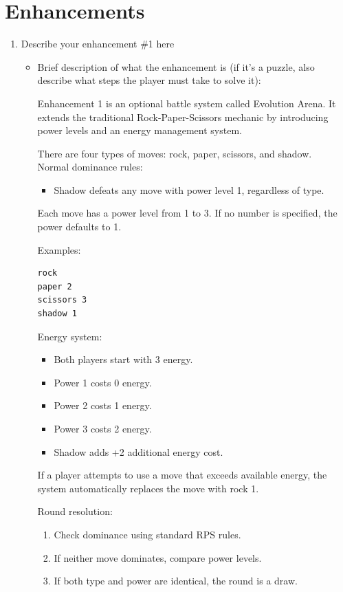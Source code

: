 \documentclass[11pt]{article}
\begin{document}
\section*{Enhancements}
\begin{enumerate}
    \item Describe your enhancement \#1 here
    \begin{itemize}
        \item Brief description of what the enhancement is (if it's a puzzle, also describe what steps the player must take to solve it):

        Enhancement 1 is an optional battle system called Evolution Arena. It extends the traditional Rock-Paper-Scissors mechanic by introducing power levels and an energy management system.

        There are four types of moves: rock, paper, scissors, and shadow.\\

        Normal dominance rules:
        \begin{itemize}
            \item Shadow defeats any move with power level 1, regardless of type.
        \end{itemize}

        Each move has a power level from 1 to 3. If no number is specified, the power defaults to 1.

        Examples:
        \begin{verbatim}
rock
paper 2
scissors 3
shadow 1
        \end{verbatim}

        Energy system:
\begin{itemize}
\item Both players start with 3 energy.
\item Power 1 costs 0 energy.
\item Power 2 costs 1 energy.
\item Power 3 costs 2 energy.
\item Shadow adds +2 additional energy cost.
\end{itemize}


If a player attempts to use a move that exceeds available energy, the system automatically replaces the move with rock 1.

\bigskip
Round resolution:
\begin{enumerate}
\item Check dominance using standard RPS rules.
\item If neither move dominates, compare power levels.
\item If both type and power are identical, the round is a draw.
\end{enumerate}


\end{itemize}
\end{enumerate}
\end{document}
